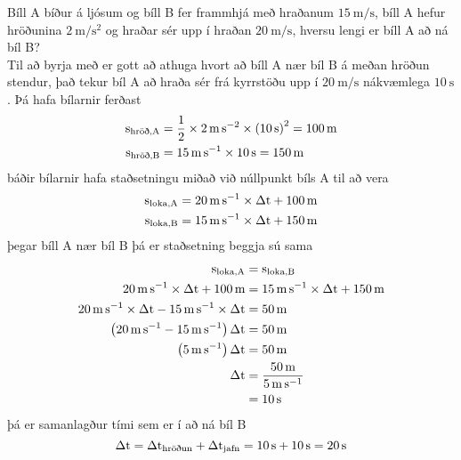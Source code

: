 \begin{formalexample}
Bíll A bíður á ljósum og bíll B fer frammhjá með hraðanum $\SI{15}{\m\per\s}$, 
bíll A hefur hröðunina $\SI{2}{\m\per\s\squared}$ og hraðar sér upp í hraðan 
$\SI{20}{\m\per\s}$, hversu lengi er bíll A að ná bíl B?
\\[4 ex]
Til að byrja með er gott að athuga hvort að bíll A nær bíl B á meðan hröðun stendur,
það tekur bíl A að hraða sér frá kyrrstöðu upp í $\SI{20}{\m\per\s}$ nákvæmlega 
$\SI{10}{\s}$. Þá hafa bílarnir ferðast
\begin{align*}
	\ulengths_\text{hröð,A} 
		&= \frac{1}{2} \times \SI{2}{\m\per\s\squared} \times 
			\left( \SI{10}{\s} \right)^2 = \SI{100}{\m} \\
	\ulengths_\text{hröð,B} 
		&= \SI{15}{\m\per\s} \times \SI{10}{\s} 
		= \SI{150}{\m}
\end{align*}
báðir bílarnir hafa staðsetningu miðað við núllpunkt bíls A til að vera
\begin{align*}
	\ulengths_\text{loka,A} 
		&= \SI{20}{\m\per\s} \times \Delta\utime + \SI{100}{\m} \\
	\ulengths_\text{loka,B} 
		&= \SI{15}{\m\per\s} \times \Delta\utime + \SI{150}{\m}
\end{align*}
þegar bíll A nær bíl B þá er staðsetning beggja sú sama
\begin{align*}
	\ulengths_\text{loka,A} &= \ulengths_\text{loka,B}\\
	\SI{20}{\m\per\s} \times \Delta\utime + \SI{100}{\m}
		&= \SI{15}{\m\per\s} \times \Delta\utime + \SI{150}{\m} \\
	\SI{20}{\m\per\s} \times \Delta\utime 
		- \SI{15}{\m\per\s} \times \Delta\utime 
		&= \SI{50}{\m} \\
	\left( 
		\SI{20}{\m\per\s} - \SI{15}{\m\per\s} 
	\right) \Delta\utime 
		&=  \SI{50}{\m} \\
	\left( \SI{5}{\m\per\s} \right) \Delta\utime 
		&=  \SI{50}{\m} \\
	\Delta\utime 
		&=  \frac{ \SI{50}{\m} }{ \SI{5}{\m\per\s} }\\
		&=  \SI{10}{\s}
\end{align*}
þá er samanlagður tími sem er í að ná bíl B
\[
	\Delta\utime = \Delta\utime_\text{hröðun} + \Delta\utime_\text{jafn}
		= \SI{10}{\s} + \SI{10}{\s} = \SI{20}{\s}
\]
\end{formalexample}
